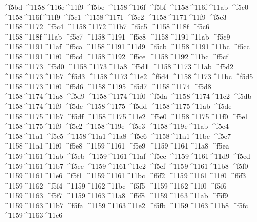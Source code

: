 \checkit ^^^^f5bd ^^^^1158^^^^116e^^^^11f9
\checkit ^^^^f5be ^^^^1158^^^^116f
\checkit ^^^^f5bf ^^^^1158^^^^116f^^^^11ab
\checkit ^^^^f5c0 ^^^^1158^^^^116f^^^^11f9
\checkit ^^^^f5c1 ^^^^1158^^^^1171
\checkit ^^^^f5c2 ^^^^1158^^^^1171^^^^11f9
\checkit ^^^^f5c3 ^^^^1158^^^^1172
\checkit ^^^^f5c4 ^^^^1158^^^^1172^^^^11b7
\checkit ^^^^f5c5 ^^^^1158^^^^118f
\checkit ^^^^f5c6 ^^^^1158^^^^118f^^^^11ab
\checkit ^^^^f5c7 ^^^^1158^^^^1191
\checkit ^^^^f5c8 ^^^^1158^^^^1191^^^^11ab
\checkit ^^^^f5c9 ^^^^1158^^^^1191^^^^11af
\checkit ^^^^f5ca ^^^^1158^^^^1191^^^^11d9
\checkit ^^^^f5cb ^^^^1158^^^^1191^^^^11bc
\checkit ^^^^f5cc ^^^^1158^^^^1191^^^^11f0
\checkit ^^^^f5cd ^^^^1158^^^^1192
\checkit ^^^^f5ce ^^^^1158^^^^1192^^^^11bc
\checkit ^^^^f5cf ^^^^1158^^^^1173
\checkit ^^^^f5d0 ^^^^1158^^^^1173^^^^11a8
\checkit ^^^^f5d1 ^^^^1158^^^^1173^^^^11ab
\checkit ^^^^f5d2 ^^^^1158^^^^1173^^^^11b7
\checkit ^^^^f5d3 ^^^^1158^^^^1173^^^^11e2
\checkit ^^^^f5d4 ^^^^1158^^^^1173^^^^11bc
\checkit ^^^^f5d5 ^^^^1158^^^^1173^^^^11f0
\checkit ^^^^f5d6 ^^^^1158^^^^1195
\checkit ^^^^f5d7 ^^^^1158^^^^1174
\checkit ^^^^f5d8 ^^^^1158^^^^1174^^^^11a8
\checkit ^^^^f5d9 ^^^^1158^^^^1174^^^^11f0
\checkit ^^^^f5da ^^^^1158^^^^1174^^^^11c2
\checkit ^^^^f5db ^^^^1158^^^^1174^^^^11f9
\checkit ^^^^f5dc ^^^^1158^^^^1175
\checkit ^^^^f5dd ^^^^1158^^^^1175^^^^11ab
\checkit ^^^^f5de ^^^^1158^^^^1175^^^^11b7
\checkit ^^^^f5df ^^^^1158^^^^1175^^^^11e2
\checkit ^^^^f5e0 ^^^^1158^^^^1175^^^^11f0
\checkit ^^^^f5e1 ^^^^1158^^^^1175^^^^11f9
\checkit ^^^^f5e2 ^^^^1158^^^^119e
\checkit ^^^^f5e3 ^^^^1158^^^^119e^^^^11ab
\checkit ^^^^f5e4 ^^^^1158^^^^11a1
\checkit ^^^^f5e5 ^^^^1158^^^^11a1^^^^11a8
\checkit ^^^^f5e6 ^^^^1158^^^^11a1^^^^11bc
\checkit ^^^^f5e7 ^^^^1158^^^^11a1^^^^11f0
\checkit ^^^^f5e8 ^^^^1159^^^^1161
\checkit ^^^^f5e9 ^^^^1159^^^^1161^^^^11a8
\checkit ^^^^f5ea ^^^^1159^^^^1161^^^^11ab
\checkit ^^^^f5eb ^^^^1159^^^^1161^^^^11af
\checkit ^^^^f5ec ^^^^1159^^^^1161^^^^11d9
\checkit ^^^^f5ed ^^^^1159^^^^1161^^^^11b7
\checkit ^^^^f5ee ^^^^1159^^^^1161^^^^11e2
\checkit ^^^^f5ef ^^^^1159^^^^1161^^^^11b8
\checkit ^^^^f5f0 ^^^^1159^^^^1161^^^^11e6
\checkit ^^^^f5f1 ^^^^1159^^^^1161^^^^11bc
\checkit ^^^^f5f2 ^^^^1159^^^^1161^^^^11f0
\checkit ^^^^f5f3 ^^^^1159^^^^1162
\checkit ^^^^f5f4 ^^^^1159^^^^1162^^^^11bc
\checkit ^^^^f5f5 ^^^^1159^^^^1162^^^^11f0
\checkit ^^^^f5f6 ^^^^1159^^^^1163
\checkit ^^^^f5f7 ^^^^1159^^^^1163^^^^11a8
\checkit ^^^^f5f8 ^^^^1159^^^^1163^^^^11ab
\checkit ^^^^f5f9 ^^^^1159^^^^1163^^^^11b7
\checkit ^^^^f5fa ^^^^1159^^^^1163^^^^11e2
\checkit ^^^^f5fb ^^^^1159^^^^1163^^^^11b8
\checkit ^^^^f5fc ^^^^1159^^^^1163^^^^11e6
